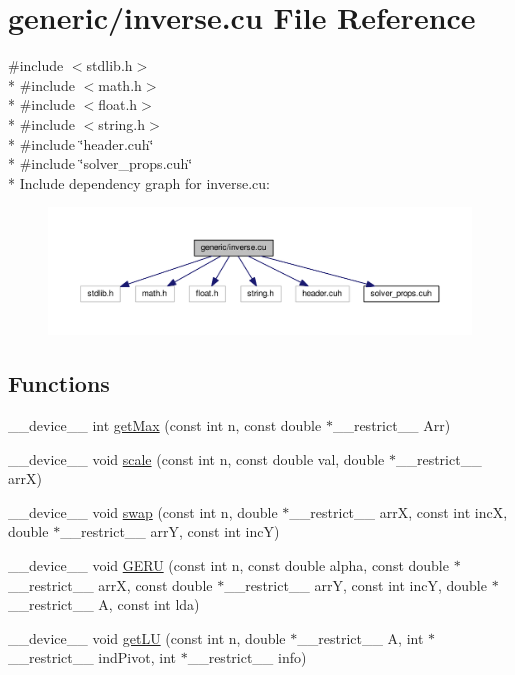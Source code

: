 \hypertarget{inverse_8cu}{}\section{generic/inverse.cu File Reference}
\label{inverse_8cu}
{\ttfamily \#include $<$stdlib.\+h$>$}\\*
{\ttfamily \#include $<$math.\+h$>$}\\*
{\ttfamily \#include $<$float.\+h$>$}\\*
{\ttfamily \#include $<$string.\+h$>$}\\*
{\ttfamily \#include \char`\"{}header.\+cuh\char`\"{}}\\*
{\ttfamily \#include \char`\"{}solver\+\_\+props.\+cuh\char`\"{}}\\*
Include dependency graph for inverse.\+cu\+:\nopagebreak
\begin{figure}[H]
\begin{center}
\leavevmode
\includegraphics[width=350pt]{inverse_8cu__incl}
\end{center}
\end{figure}
\subsection*{Functions}
\begin{DoxyCompactItemize}
\item 
\+\_\+\+\_\+device\+\_\+\+\_\+ int \hyperlink{inverse_8cu_a7b3d468c8500704ef2452f40b23810bb}{get\+Max} (const int n, const double $\ast$\+\_\+\+\_\+restrict\+\_\+\+\_\+ Arr)
\item 
\+\_\+\+\_\+device\+\_\+\+\_\+ void \hyperlink{inverse_8cu_adbb4f3f3af5f968a94f717729803c88d}{scale} (const int n, const double val, double $\ast$\+\_\+\+\_\+restrict\+\_\+\+\_\+ arrX)
\item 
\+\_\+\+\_\+device\+\_\+\+\_\+ void \hyperlink{inverse_8cu_adac70ba85b61598b9fcee8a381eed708}{swap} (const int n, double $\ast$\+\_\+\+\_\+restrict\+\_\+\+\_\+ arrX, const int incX, double $\ast$\+\_\+\+\_\+restrict\+\_\+\+\_\+ arrY, const int incY)
\item 
\+\_\+\+\_\+device\+\_\+\+\_\+ void \hyperlink{inverse_8cu_a8dbfcd45123f24c8d64e2049ae2782fe}{G\+E\+RU} (const int n, const double alpha, const double $\ast$\+\_\+\+\_\+restrict\+\_\+\+\_\+ arrX, const double $\ast$\+\_\+\+\_\+restrict\+\_\+\+\_\+ arrY, const int incY, double $\ast$\+\_\+\+\_\+restrict\+\_\+\+\_\+ A, const int lda)
\item 
\+\_\+\+\_\+device\+\_\+\+\_\+ void \hyperlink{inverse_8cu_a25bf32c703aa4b2a43131df214ee0375}{get\+LU} (const int n, double $\ast$\+\_\+\+\_\+restrict\+\_\+\+\_\+ A, int $\ast$\+\_\+\+\_\+restrict\+\_\+\+\_\+ ind\+Pivot, int $\ast$\+\_\+\+\_\+restrict\+\_\+\+\_\+ info)
\end{DoxyCompactItemize}


